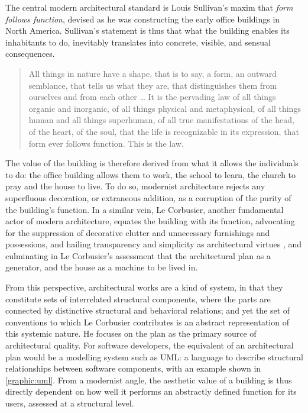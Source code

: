 The central modern architectural standard is Louis Sullivan's maxim that \emph{form follows function}, devised as he was constructing the early office buildings in North America. Sullivan's statement is thus that what the building enables its inhabitants to do, inevitably translates into concrete, visible, and sensual consequences.

\begin{quote}
    All things in nature have a shape, that is to say, a form, an outward semblance, that tells us what they are, that distinguishes them from ourselves and from each other
    \dots
    It is the pervading law of all things organic and inorganic, of all things physical and metaphysical, of all things human and all things superhuman, of all true manifestations of the head, of the heart, of the soul, that the life is recognizable in its expression, that form ever follows function. This is the law. \citep{sullivan_tall_1896}
\end{quote}

The value of the building is therefore derived from what it allows the individuals to do: the office building allows them to work, the school to learn, the church to pray and the house to live. To do so, modernist architecture rejects any superfluous decoration, or extraneous addition, as a corruption of the purity of the building's function. In a similar vein, Le Corbusier, another fundamental actor of modern architecture, equates the building with its function, advocating for the suppression of decorative clutter and unnecessary furnishings and possessions, and hailing transparency and simplicity as architectural virtues \citep{lecorbusier_vers_1923}, and culminating in Le Corbusier's assessment that the architectural plan as a generator, and the house as a machine to be lived in.

From this perspective, architectural works are a kind of system, in that they constitute sets of interrelated structural components, where the parts are connected by distinctive structural and behavioral relations; and yet the set of conventions to which Le Corbusier contributes is an abstract representation of this systemic nature. He focuses on the plan as the primary source of architectural quality. For software developers, the equivalent of an architectural plan would be a modelling system such as UML: a language to describe structural relationships between software components, with an example shown in \ref{graphic:uml}. From a modernist angle, the aesthetic value of a building is thus directly dependent on how well it performs an abstractly defined function for its users, assessed at a structural level.

